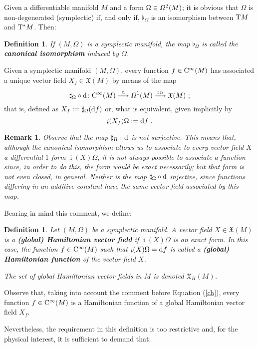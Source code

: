\documentclass[12pt]{report}
\newtheorem{definition}[teor]{Definition}
\newtheorem{remark}[teor]{Remark}
\def\beq{\begin{equation}}
\def\eeq{\end{equation}}
\def\mapping#1{\mathrel{\mathop{\longrightarrow}\limits^{#1}}}
\def\vf{\mathfrak X}
\def\df{{\mit\Omega}}
\def\d{{\rm d}}
\def\Tan{{\rm T}}
\def\inn{\mathop{i}\nolimits}
\def\Cinfty{{\rm C}^\infty}
\begin{document}
Given a differentiable manifold $M$
and a form $\Omega\in\df^2(M)$;
it is obvious that $\Omega$ is non-degenerated (symplectic) if, and only if,
$\flat_\Omega$ is an isomorphism between $\Tan M$ and $\Tan^{*} M$. Then:

\begin{definition}
If $(M,\Omega)$ is a symplectic manifold, the map
$\flat_\Omega$ is called the \textbf{canonical isomorphism} induced by
$\Omega$.
\end{definition}

Given a symplectic manifold $(M,\Omega )$,
every function $f \in \Cinfty (M)$ has associated a unique
vector field $X_f \in \vf (M)$ by means of the map
$$
\sharp_\Omega\circ\d\colon \Cinfty (M)\mapping{\d}
\df^1(M)\mapping{\sharp_\Omega}\vf (M) \ ;
$$
that is, defined as $X_f:=\sharp_\Omega(\d f)$
or, what is equivalent, given implicitly by
\beq
\inn(X_f)\Omega:=\d f \ .
\label{ch}
\eeq

\begin{remark}{\rm 
Observe that the map $\sharp_\Omega\circ\d$ is not surjective.
This means that, although the canonical isomorphism allows us to
associate to every vector field $X$ a differential $1$-form 
$\inn(X)\Omega$,
it is not always possible to associate a function since,
in order to do this, the form would be exact necessarily;
but that form is not even closed, in general.
Neither is the map $\sharp_\Omega\circ\d$ injective,
since functions differing in an additive constant have
the same vector field associated by this map.
}\end{remark}

Bearing in mind this comment, we define:

\begin{definition}
Let $(M,\Omega )$ be a symplectic manifold. A vector field $X \in \vf (M)$ is a
\textbf{ (global) Hamiltonian vector field} if
$\inn(X)\Omega$ is an exact form.
In this case, the function $f \in \Cinfty (M)$
such that $\inn(X)\Omega = \d f$
is called a {\sl \textbf{(global) Hamiltonian function}}
of the vector field $X$.

The set of global Hamiltonian vector fields in $M$ is denoted $\vf_H (M)$.
\end{definition}

Observe that, taking into account the comment before Equation
(\ref{ch}), every function $f\in\Cinfty (M)$
is a Hamiltonian function of a global Hamiltonian vector field $X_f$.

Nevertheless, the requirement in this definition is too restrictive
and,  for the physical interest, it is sufficient to demand that:
\end{document}
